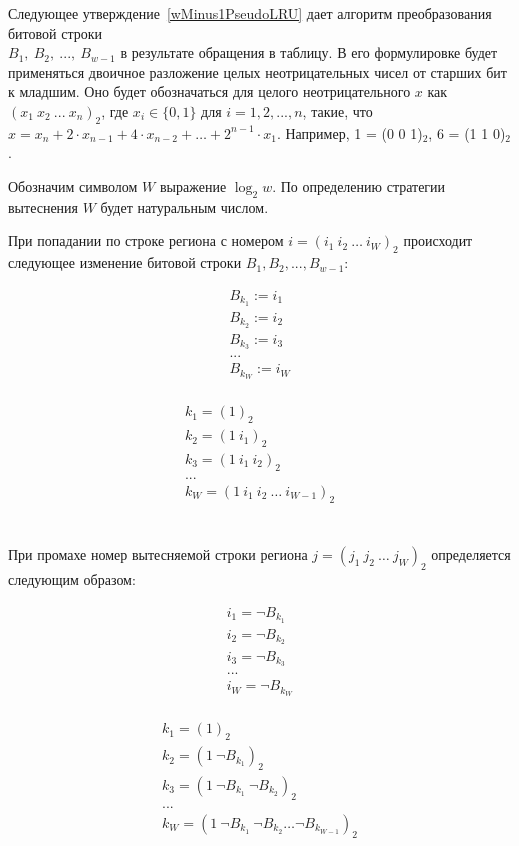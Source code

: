 Следующее утверждение~\ref{wMinus1PseudoLRU} дает алгоритм
преобразования битовой строки\\ $B_1,~B_2,~...,~B_{w{-}1}$ в результате
обращения в таблицу. В его формулировке будет применяться двоичное
разложение целых неотрицательных чисел от старших бит к младшим. Оно будет обозначаться для целого неотрицательного $x$ как $(x_1~x_2~...~x_n)_2$, где $x_i \in \{0, 1\}$ для $i = 1, 2, ..., n$, такие, что $x = x_n + 2{\cdot}x_{n-1} + 4{\cdot}x_{n-2} + \dots + 2^{n-1}{\cdot}x_1$. Например, 1 = (0 0 1)$_2$, 6 = (1 1 0)$_2$.

Обозначим символом $W$ выражение $\log_2 w$. По определению
стратегии вытеснения \PseudoLRU $W$ будет натуральным числом.

\begin{utv}\label{wMinus1PseudoLRU}При попадании по строке региона с номером $i = (i_1~i_2~\dots~i_W)_2$ происходит следующее изменение битовой строки $B_1,
B_2, ..., B_{w{-}1}$:

\parbox{0.3\textwidth}{
  $$ \begin{array}{l}
  B_{k_1} := i_1 \\
  B_{k_2} := i_2 \\
  B_{k_3} := i_3 \\
  ...\\
  B_{k_W} := i_W \\
  \end{array}$$
} \vline
\parbox{0.7\textwidth}{
  $$ \begin{array}{l}
  k_1 = (1)_2 \\
  k_2 = (1~i_1)_2 \\
  k_3 = (1~i_1~i_2)_2 \\
  ...\\
  k_W = (1~i_1~i_2~\dots~i_{W{-}1})_2 \\
  \end{array} $$
}
\\[1cm]

При промахе номер вытесняемой строки региона $j = (j_1~j_2~\dots~j_W)_2$ определяется следующим образом:

\parbox{0.3\textwidth}{
  $$ \begin{array}{l}
  i_1 = \neg B_{k_1} \\
  i_2 = \neg B_{k_2} \\
  i_3 = \neg B_{k_3} \\
  ...\\
  i_W = \neg B_{k_W} \\
  \end{array}$$
} \vline
\parbox{0.7\textwidth}{
  $$ \begin{array}{l}
  k_1 = (1)_2 \\
  k_2 = (1~\neg B_{k_1})_2 \\
  k_3 = (1~\neg B_{k_1}~\neg B_{k_2})_2 \\
  ...\\
  k_W = (1~\neg B_{k_1}~\neg B_{k_2}\dots\neg B_{k_{W{-}1}})_2 \\
  \end{array} $$
}
\\[0.5cm]


\end{utv}
